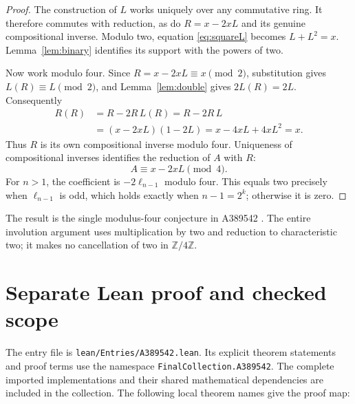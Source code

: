 \documentclass[11pt,a4paper]{article}
\theoremstyle{remark}
\newcommand{\Z}{\mathbb Z}
\begin{document}
\begin{proof}
The construction of $L$ works uniquely over any commutative ring.
It therefore commutes with reduction, as do $R=x-2xL$ and its genuine
compositional inverse. Modulo two, equation \eqref{eq:squareL} becomes
$L+L^2=x$. Lemma~\ref{lem:binary} identifies its support with the powers
of two.

Now work modulo four. Since $R=x-2xL\equiv x\pmod2$, substitution gives
$L(R)\equiv L\pmod2$, and Lemma~\ref{lem:double} gives
$2L(R)=2L$. Consequently
\begin{align*}
 R(R)&=R-2R\,L(R)=R-2R\,L\\
     &=(x-2xL)(1-2L)=x-4xL+4xL^2=x.
\end{align*}
Thus $R$ is its own compositional inverse modulo four.
Uniqueness of compositional inverses identifies the reduction of $A$
with $R$:
\[
 A\equiv x-2xL\pmod4.
\]
For $n>1$, the coefficient is $-2\ell_{n-1}$ modulo four. This equals
two precisely when $\ell_{n-1}$ is odd, which holds exactly when
$n-1=2^k$; otherwise it is zero.
\end{proof}

The result is the single modulus-four conjecture in A389542
\cite{oeis542}. The entire involution argument uses multiplication by
two and reduction to characteristic two; it makes no cancellation of
two in $\Z/4\Z$.


\section{Separate Lean proof and checked scope}

The entry file is \nolinkurl{lean/Entries/A389542.lean}. Its explicit
theorem statements and proof terms use the namespace
\nolinkurl{FinalCollection.A389542}. The complete imported implementations
and their shared mathematical dependencies are included in the collection.
The following local theorem names give the proof map:
\end{document}
